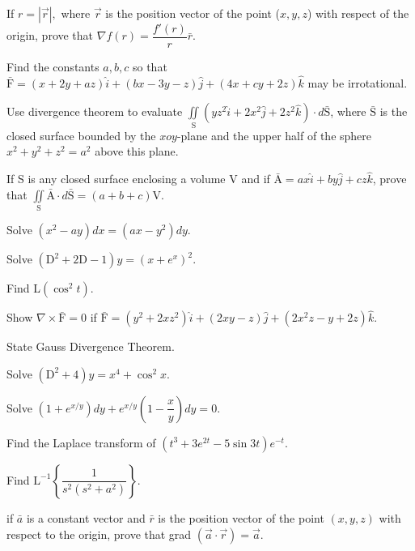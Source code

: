 \item \iitem If $r = |\vec{r}|,$ where $\vec{r}$ is the position vector of the point ($x, y, z$)
  with respect of the origin, prove that 
  $\nabla f(r) = \dfrac{f'(r)}{r}\bar{r}.$
\Or
\item Find the constants $a, b, c$ so that $\bar{\text{F}} = (x+2y+az)\hat{i} + (bx-3y-z)\hat{j} +
  (4x +cy +2z)\hat{k}$ may be irrotational.
\ene

\item \iitem Use divergence theorem to evaluate $\iint\limits_\text{S}(yz^2\hat{i} + 2x^2\hat{j} +
  2z^2\hat{k})\cdot d\bar{\text{S}}$, 
  where $\bar{\text{S}}$ is the closed surface bounded by the $xoy$-plane and the upper half of
  the sphere $x^2 + y^2 + z^2 = a^2$ above this plane.
\Or
\item If S is any closed surface enclosing a volume V and if $\bar{\text{A}}= ax\hat{i} +
  by\hat{j} + cz\hat{k}$, prove that
  $\iint\limits_\text{S}\bar{\text{A}}\cdot d \bar{\text{S}} = (a + b + c)$V.
\ene

\markC
\ene

\newpage

\sub{\subject}
\maxtime

\partA

\iitem Solve $ (x^2  - ay)dx = (ax - y^2)dy.$
\item Solve $\left(\text{D}^2 + 2\text{D} -1\right)y = (x + e^x)^2$.
\item Find L$(\cos^2 t )$.
\item Show $\nabla \times \bar{\text{F}} = 0$ if $\bar{\text{F}} = (y^2 + 2xz^2 ) \hat{i} + (2xy - z)
  \hat{j}  + (2x^2z - y + 2z)\hat{k}.$
\item State Gauss Divergence Theorem. 

\markA
\partB

\item Solve $ \left(\text{D}^2 + 4\right)y = x^4 + \cos ^2x$.
\item Solve $( 1 + e^{x/y})dy + e^{x/y}\left( 1 - \dfrac{x}{y}\right)dy=0.$
\item Find the Laplace transform of $(t^3 + 3e^{2t}  -5\sin 3t)e^{-t}.$
\item Find $\text{L}^{-1}\left\{\dfrac{1}{s^2(s^2+ a^2)}\right\}$.
\item if $\bar{a}$ is a constant vector and $\bar{r}$ is the position vector of the point $(x,y,z)$
  with respect to the origin, prove that grad $(\vec{a}\cdot\vec{r}) = \vec{a}.$

